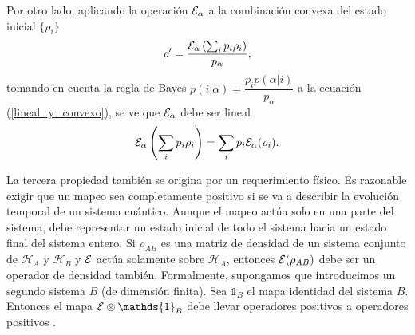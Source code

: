 Por otro lado, aplicando la operación $\mathcal{E}_\alpha$  a la combinación convexa del
estado inicial $\{\rho_i\}$ \begin{equation}
    \rho'=\dfrac{\mathcal{E}_\alpha\left(\sum_i p_i \rho_i\right)}{p_\alpha},
\end{equation} tomando en cuenta la regla de Bayes  $p(i|\alpha)=\dfrac{p_i
p(\alpha|i)}{ p_\alpha} $ a la ecuación ({\ref{lineal_y_convexo}}),  se ve que
$\mathcal{E}_\alpha$ debe ser lineal {\cite{preskill2020quantum}} 
\begin{equation}
    \mathcal{E}_\alpha\left(\sum_i p_i \rho_i\right)=\sum_i p_i\mathcal{E}_\alpha(\rho_i). 
\end{equation}

La tercera propiedad también se origina por un requerimiento físico. Es
razonable exigir que un mapeo sea completamente positivo si se va a describir
la evolución temporal de un sistema cuántico. Aunque el mapeo actúa solo en una
parte del sistema, debe representar un estado inicial de todo el sistema hacia
un estado final del sistema entero. Si $\rho_{AB}$ es una matriz de densidad de
un sistema conjunto de $\mathcal{H}_A$ y $\mathcal{H}_{B}$  y $\mathcal{E}$ actúa
solamente sobre $\mathcal{H}_A$, entonces $\mathcal{E}(\rho_{AB})$  debe ser un operador
de densidad también. Formalmente, supongamos que introducimos un segundo
sistema $B$ (de dimensión finita). Sea $\mathds{1}_{B}$ el mapa identidad del
sistema $B$. Entonces el mapa $\E\otimes \mathds{1}_{B}$ debe llevar operadores
positivos a operadores positivos {\cite{nielsen_chuang_2010, preskill2020quantum}}. 

